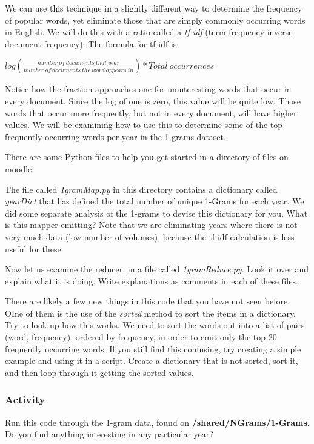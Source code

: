 \documentclass[letterpaper,10pt,openany,oneside]{sphinxmanual}
\begin{document}
We can use this technique in a slightly different way to determine
the frequency of popular words, yet eliminate those that are simply
commonly occurring words in English. We will do this with a ratio
called a \emph{tf-idf} (term frequency-inverse document frequency). The
formula for tf-idf is:

$log\left( \frac{number \ of \ documents \ that \ year}{number \ of \ documents \ the \ word \ appears \ in} \right) * Total \ occurrences$

Notice how the fraction approaches one for uninteresting words that
occur in every document. Since the log of one is zero, this value
will be quite low. Those words that occur more frequently, but not
in every document, will have higher values. We will be examining
how to use this to determine some of the top frequently occurring
words per year in the 1-grams dataset.

There are some Python files to help you get started in a directory
of files on moodle.

The file called \emph{1gramMap.py} in this directory contains a
dictionary called \emph{yearDict} that has defined the total number of
unique 1-Grams for each year. We did some separate analysis of the
1-grams to devise this dictionary for you. What is this mapper
emitting? Note that we are eliminating years where there is not
very much data (low number of volumes), because the tf-idf
calculation is less useful for these.

Now let us examine the reducer, in a file called \emph{1gramReduce.py}.
Look it over and explain what it is doing. Write explanations as
comments in each of these files.

There are likely a few new things in this code that you have not
seen before. OIne of them is the use of the \emph{sorted} method to sort
the items in a dictionary. Try to look up how this works. We need
to sort the words out into a list of pairs (word, frequency),
ordered by frequency, in order to emit only the top 20 frequently
occurring words. If you still find this confusing, try creating a
simple example and using it in a script. Create a dictionary that
is not sorted, sort it, and then loop through it getting the sorted
values.


\subsubsection{Activity}
\label{WmrActivities/WmrActivities:activity}
Run this code through the 1-gram data, found on \textbf{/shared/NGrams/1-Grams}. Do
you find anything interesting in any particular year?
\end{document}
